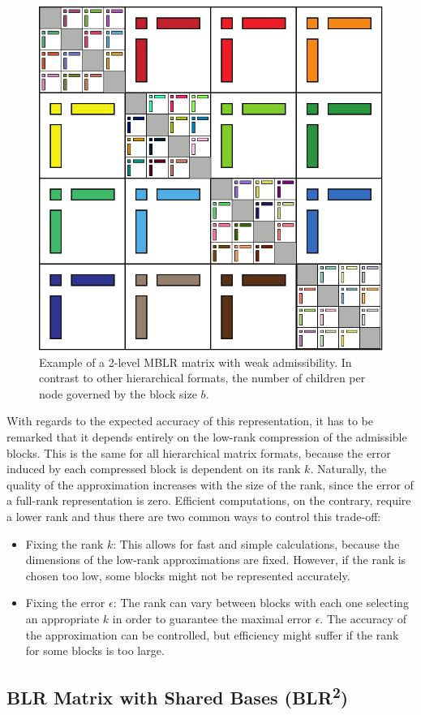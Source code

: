 \begin{figure}[h]
    \centering
    \includegraphics[width=0.6\linewidth]{chapters/4_hierarchical_matrices/figures/MBLR.pdf}
    \caption[Multilevel Block Low-Rank Matrix]{Example of a 2-level MBLR matrix with weak admissibility. In contrast to other hierarchical formats, the number of children per node governed by the block size $b$.}
    \label{fig:mblr}
\end{figure}

With regards to the expected accuracy of this representation, it has to be remarked that it depends entirely on the low-rank compression of the admissible blocks. This is the same for all hierarchical matrix formats, because the error induced by each compressed block is dependent on its rank $k$. Naturally, the quality of the approximation increases with the size of the rank, since the error of a full-rank representation is zero. Efficient computations, on the contrary, require a lower rank and thus there are two common ways to control this trade-off:
\begin{itemize}
    \item Fixing the rank $k$: This allows for fast and simple calculations, because the dimensions of the low-rank approximations are fixed. However, if the rank is chosen too low, some blocks might not be represented accurately.
    \item Fixing the error $\epsilon$: The rank can vary between blocks with each one selecting an appropriate $k$ in order to guarantee the maximal error $\epsilon$. The accuracy of the approximation can be controlled, but efficiency might suffer if the rank for some blocks is too large.
\end{itemize}

\subsection{BLR Matrix with Shared Bases (BLR\texorpdfstring{\textsuperscript{2}}{2})}
\label{sec:blr2}

